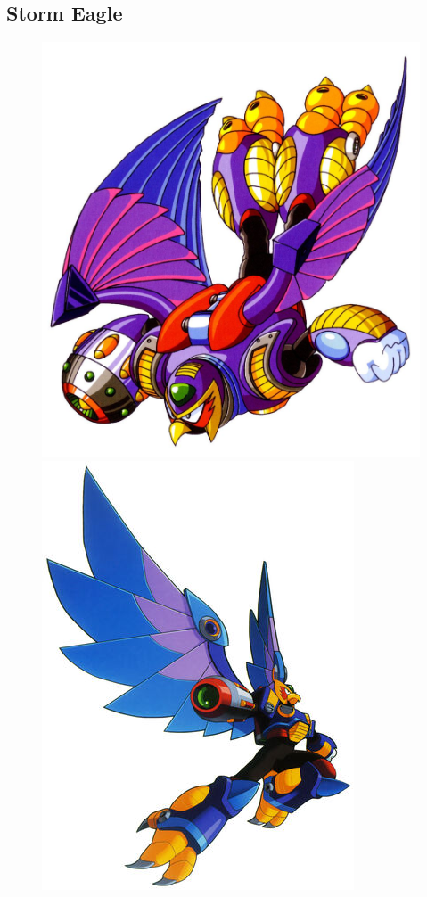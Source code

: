 \subsection{Storm Eagle}\label{boss:Storm_Eagle}
\begin{figure}[htp]
	\centering
	\includegraphics[height=\portraitsize]{figures/X1/Storm_eagle/Storm_Eagle.jpg}
	\includegraphics[height=\portraitsize]{figures/X1/Storm_eagle/MHXStormEagle.jpg}

\end{figure}
